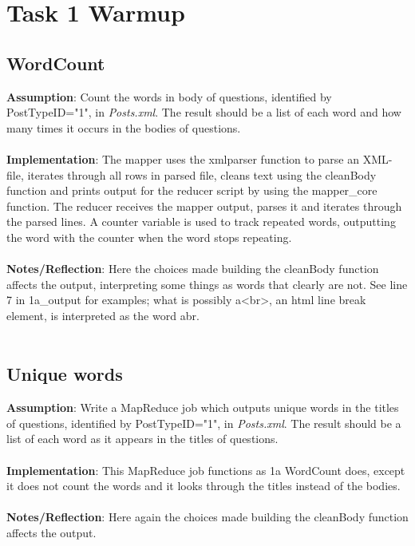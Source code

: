\documentclass[fleqn,10pt]{wlscirep}
\begin{document}
\section{Task 1 Warmup}
\subsection{WordCount}
\textbf{Assumption}: Count the words in body of questions, identified by PostTypeID="1", in \textit{Posts.xml}. The result should be a list of each word and how many times it occurs in the bodies of questions. \\ \\
\textbf{Implementation}: The mapper uses the xmlparser function to parse an XML-file, iterates through all rows in parsed file, cleans text using the cleanBody function and prints output for the reducer script by using the mapper\_core function.
The reducer receives the mapper output, parses it and iterates through the parsed lines. A counter variable is used to track repeated words, outputting the word with the counter when the word stops repeating. \\ \\
\textbf{Notes/Reflection}: Here the choices made building the cleanBody function affects the output, interpreting some things as words that clearly are not. See line 7 in 1a\_output for examples; what is possibly a<br>, an html line break element, is interpreted as the word abr. \\ \\



\subsection{Unique words}
\textbf{Assumption}: Write a MapReduce job which outputs unique words in the titles of questions, identified by PostTypeID="1", in \textit{Posts.xml}. The result should be a list of each word as it appears in the titles of questions. \\ \\
\textbf{Implementation}: This MapReduce job functions as 1a WordCount does, except it does not count the words and it looks through the titles instead of the bodies. \\ \\
\textbf{Notes/Reflection}: Here again the choices made building the cleanBody function affects the output.

\end{document}

